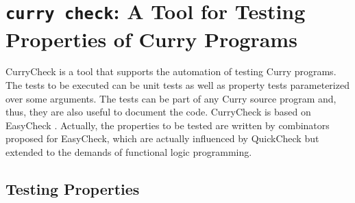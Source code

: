\section{\texttt{curry check}: A Tool for Testing Properties of Curry Programs}
\label{sec-currycheck}

CurryCheck
is a tool that supports the automation of
testing Curry programs.
The tests to be executed can be unit tests as well as
property tests parameterized over some arguments.
The tests can be part of any Curry source program
and, thus, they are also useful to document the code.
CurryCheck is based on EasyCheck \cite{ChristiansenFischer08FLOPS}.
Actually, the properties to be tested are written
by combinators proposed for EasyCheck, which are actually
influenced by QuickCheck \cite{ClaessenHughes00}
but extended to the demands of functional logic programming.

\subsection{Testing Properties}

